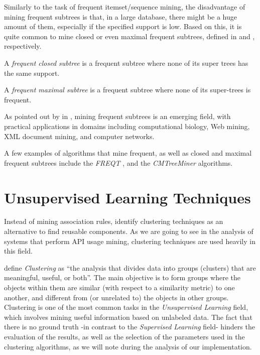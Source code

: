 Similarly to the task of frequent itemset/sequence mining, the disadvantage of mining frequent subtrees is that, in a large database, there might be a huge amount of them, especially if the specified support is low. Based on this, it is quite common to mine closed or even maximal frequent subtrees, defined in  and , respectively.

\begin{defn}
\label{def:freq-closed-tree}
A \textit{frequent closed subtree} is a frequent subtree where none of its super trees has the same support.
\end{defn}

\begin{defn}
\label{def:freq-maximal-tree}
A \textit{frequent maximal subtree} is a frequent subtree where none of its super-trees is frequent.
\end{defn}

As pointed out by  in \cite{Chi:2005}, mining frequent subtrees is an emerging field, with practical applications in domains including computational biology, Web mining, XML document mining, and computer networks.

A few examples of algorithms that mine frequent, as well as closed and maximal frequent subtrees include the \textit{FREQT} \cite{Kenji:2004}, and the \textit{CMTreeMiner} \cite{Chi:2004} algorithms.


\section{Unsupervised Learning Techniques}
\label{sec:unsupervised-learning}

Instead of mining association rules,  \cite{Ishag:2016} identify clustering techniques as an alternative to find reusable components. As we are going to see in the analysis of systems that perform API usage mining, clustering techniques are used heavily in this field.

 \cite{Pang:2006} define \textit{Clustering} as ``the analysis that divides data into groups (clusters) that are meaningful, useful, or both''. The main objective is to form groups where the objects within them are similar (with respect to a similarity metric) to one another, and different from (or unrelated to) the objects in other groups. Clustering is one of the most common tasks in the \textit{Unsupervised Learning} field, which involves mining useful information based on unlabeled data. The fact that there is no ground truth -in contrast to the \textit{Supervised Learning} field- hinders the evaluation of the results, as well as the selection of the parameters used in the clustering algorithms, as we will note during the analysis of our implementation.



